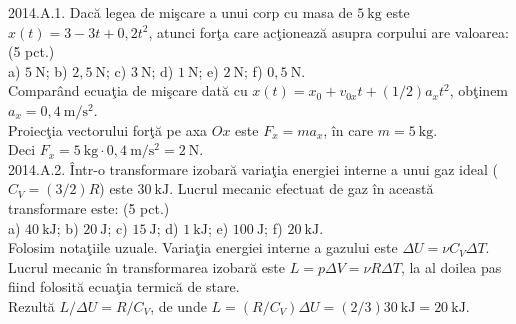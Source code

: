 

2014.A.1. Dacă legea de mişcare a unui corp cu masa de $5 \mathrm{~kg}$ este $x(t)=3-3 t+0,2 t^{2}$, atunci forţa care acţionează asupra corpului are valoarea: (5 pct.)\\ a) $5 \mathrm{~N}$; b) $2,5 \mathrm{~N}$; c) $3 \mathrm{~N}$; d) $1 \mathrm{~N}$; e) $2 \mathrm{~N}$; f) $0,5 \mathrm{~N}$.\\ Comparând ecuaţia de mişcare dată cu $x(t)=x_{0}+v_{0 x} t+(1 / 2) a_{x} t^{2}$, obţinem $a_{x}=0,4 \mathrm{~m} / \mathrm{s}^{2}$.\\ Proiecţia vectorului forţă pe axa $O x$ este $F_{x}=m a_{x}$, în care $m=5 \mathrm{~kg}$.\\ Deci $F_{x}=5 \mathrm{~kg} \cdot 0,4 \mathrm{~m} / \mathrm{s}^{2}=2 \mathrm{~N}$.\\

2014.A.2. Într-o transformare izobară variaţia energiei interne a unui gaz ideal ($C_{V}=(3 / 2) R$) este $30 \mathrm{~kJ}$. Lucrul mecanic efectuat de gaz în această transformare este: (5 pct.)\\ a) $40 \mathrm{~kJ}$; b) $20 \mathrm{~J}$; c) $15 \mathrm{~J}$; d) $1 \mathrm{~kJ}$; e) $100 \mathrm{~J}$; f) $20 \mathrm{~kJ}$.\\ Folosim notaţiile uzuale. Variaţia energiei interne a gazului este $\Delta U=\nu C_{V} \Delta T$. Lucrul mecanic în transformarea izobară este $L=p \Delta V=\nu R \Delta T$, la al doilea pas fiind folosită ecuaţia termică de stare.\\ Rezultă $L / \Delta U=R / C_{V}$, de unde $L=\left(R / C_{V}\right) \Delta U=(2 / 3) 30 \mathrm{~kJ}=20 \mathrm{~kJ}$.\\

